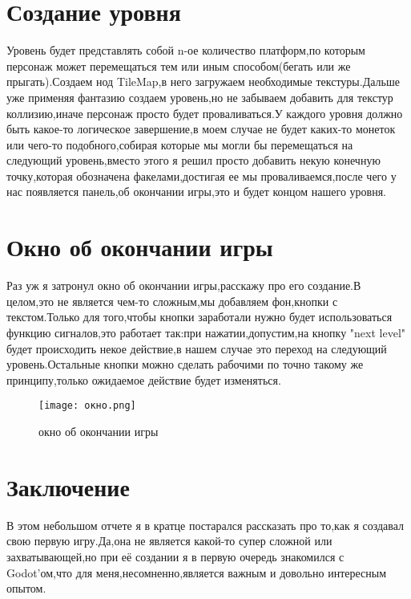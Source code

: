 \documentclass{article}
\begin{document}
	\section{Создание уровня}
	Уровень будет представлять собой n-ое количество платформ,по которым персонаж может перемещаться тем или иным способом(бегать или же прыгать).Создаем нод TileMap,в него загружаем необходимые текстуры.Дальше уже применяя фантазию создаем уровень,но не забываем добавить для текстур коллизию,иначе персонаж просто будет проваливаться.У каждого уровня должно быть какое-то логическое завершение,в моем случае не будет каких-то монеток или чего-то подобного,собирая которые мы могли бы перемещаться на следующий уровень,вместо этого я решил просто добавить некую конечную точку,которая обозначена факелами,достигая ее мы проваливаемся,после чего у нас появляется панель,об окончании игры,это и будет концом нашего уровня.
	\section {Окно об окончании игры}
	Раз уж я затронул окно об окончании игры,расскажу про его создание.В целом,это не является чем-то сложным,мы добавляем фон,кнопки с текстом.Только для того,чтобы кнопки заработали нужно будет использоваться функцию сигналов,это работает так:при нажатии,допустим,на кнопку "next level" будет происходить некое действие,в нашем случае это переход на следующий уровень.Остальные кнопки можно сделать рабочими по точно такому же принципу,только ожидаемое действие будет изменяться.
		\begin{figure}
		\centering
		\texttt{[image: окно.png]}
		\caption{окно об окончании игры}
		
	\end{figure}
	\section{Заключение}
	В этом небольшом отчете я в кратце постарался рассказать про то,как я создавал свою первую игру.Да,она не является какой-то супер сложной или захватывающей,но при её создании я в первую очередь знакомился с Godot'ом,что для меня,несомненно,является важным и довольно интересным опытом.
\end{document}
